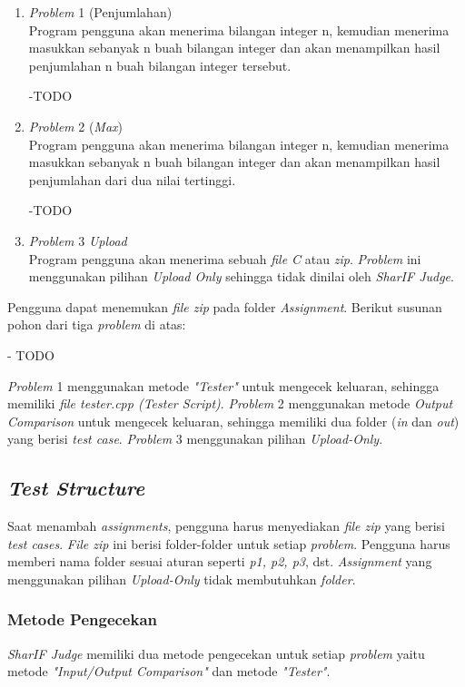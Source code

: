 \begin{enumerate}
	\item \textit{Problem} 1 (Penjumlahan) \\
	Program pengguna akan menerima bilangan integer n, kemudian menerima masukkan sebanyak n buah bilangan integer dan akan menampilkan hasil penjumlahan n buah bilangan integer tersebut.
	
	-TODO
	
	\item \textit{Problem} 2 (\textit{Max}) \\
	Program pengguna akan menerima bilangan integer n, kemudian menerima masukkan sebanyak n buah bilangan integer dan akan menampilkan hasil penjumlahan dari dua nilai tertinggi.
	
	-TODO
	
	\item \textit{Problem} 3 \textit{Upload} \\
	Program pengguna akan menerima sebuah \textit{file C} atau \textit{zip}. \textit{Problem} ini menggunakan pilihan \textit{Upload Only} sehingga tidak dinilai oleh \textit{SharIF Judge}.
\end{enumerate}

Pengguna dapat menemukan \textit{file zip} pada folder \textit{Assignment}. Berikut susunan pohon dari tiga \textit{problem} di atas:

- TODO

\textit{Problem} 1 menggunakan metode \textit{"Tester"} untuk mengecek keluaran, sehingga memiliki \textit{file tester.cpp (Tester Script)}. \textit{Problem} 2 menggunakan metode \textit{Output Comparison} untuk mengecek keluaran, sehingga memiliki dua folder (\textit{in} dan \textit{out}) yang berisi \textit{test case}. \textit{Problem} 3 menggunakan pilihan \textit{Upload-Only}.

\subsection{\textit{Test Structure}}
Saat menambah \textit{assignments}, pengguna harus menyediakan \textit{file zip} yang berisi \textit{test cases}. \textit{File zip} ini berisi folder-folder untuk setiap \textit{problem}. Pengguna harus memberi nama folder sesuai aturan seperti \textit{p1, p2, p3}, dst. \textit{Assignment} yang menggunakan pilihan \textit{Upload-Only} tidak membutuhkan \textit{folder}.

\subsubsection{Metode Pengecekan}
\textit{SharIF Judge} memiliki dua metode pengecekan untuk setiap \textit{problem} yaitu metode \textit{"Input/Output Comparison"} dan metode \textit{"Tester"}.

